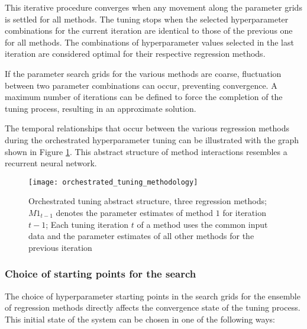 This iterative procedure converges when any movement along the parameter grids is settled for all methods. The tuning stops when the selected hyperparameter combinations for the current iteration are identical to those of the previous one for all methods. The combinations of hyperparameter values selected in the last iteration are considered optimal for their respective regression methods.

If the parameter search grids for the various methods are coarse, fluctuation between two parameter combinations can occur, preventing convergence. A maximum number of iterations can be defined to force the completion of the tuning process, resulting in an approximate solution. 

The temporal relationships that occur between the various regression methods during the orchestrated hyperparameter tuning can be illustrated with the graph shown in Figure \ref{fig:orc_tun_struct}. This abstract structure of method interactions resembles a recurrent neural network.

\begin{figure}[H]
	\centering
	\texttt{[image: orchestrated\_tuning\_methodology]}
	\caption{Orchestrated tuning abstract structure, three regression methods; $M1_{t-1}$ denotes the parameter estimates of method $1$ for iteration $t-1$; Each tuning iteration $t$ of a method uses the common input data and the parameter estimates of all other methods for the previous iteration}
	\label{fig:orc_tun_struct}
\end{figure}

\subsubsection{Choice of starting points for the search}
The choice of hyperparameter starting points in the search grids for the ensemble of regression methods directly affects the convergence state of the tuning process. This initial state of the system can be chosen in one of the following ways:

